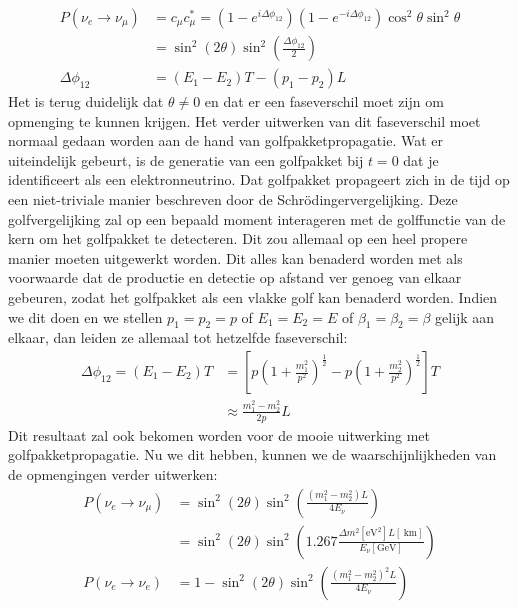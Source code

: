 \documentclass[../main.tex]{subfiles}
\begin{document}
\begin{equation}
    \begin{aligned}
        \label{eq:neutrino_2_oscilaties_5}
        P\left(\nu_{e} \rightarrow \nu_{\mu}\right) &=c_{\mu} c_{\mu}^{*}=\left(1-e^{i \Delta \phi_{12}}\right)\left(1-e^{-i \Delta \phi_{12}}\right) \cos ^{2} \theta \sin ^{2} \theta \\
                                                    &=\sin ^{2}(2 \theta) \sin ^{2}\left(\frac{\Delta \phi_{12}}{2}\right)\\
        \Delta \phi_{12}&=\left(E_{1}-E_{2}\right) T-\left(p_{1}-p_{2}\right) L
    \end{aligned}
\end{equation}
Het is terug duidelijk dat $\theta\neq 0$ en dat er een faseverschil moet zijn om opmenging te kunnen krijgen. Het verder uitwerken van dit faseverschil moet normaal gedaan worden aan de hand van golfpakketpropagatie. Wat er uiteindelijk gebeurt, is de generatie van een golfpakket bij $t=0$ dat je identificeert als een elektronneutrino. Dat golfpakket propageert zich in de tijd op een niet-triviale manier beschreven door de Schrödingervergelijking. Deze golfvergelijking zal op een bepaald moment interageren met de golffunctie van de kern om het golfpakket te detecteren. Dit zou allemaal op een heel propere manier moeten uitgewerkt worden. Dit alles kan benaderd worden met als voorwaarde dat de productie en detectie op afstand ver genoeg van elkaar gebeuren, zodat het golfpakket als een vlakke golf kan benaderd worden. Indien we dit doen en we stellen $p_{1}=p_{2}=p$ of $E_{1}=E_{2}=E$ of $\beta_{1}=\beta_{2}=\beta$ gelijk aan elkaar, dan leiden ze allemaal tot hetzelfde faseverschil:
\begin{equation}
    \begin{aligned}
        \label{eq:neutrino_2_oscilaties_6}
        \Delta \phi_{12}=\left(E_{1}-E_{2}\right) T &=\left[p\left(1+\frac{m_{1}^{2}}{p^{2}}\right)^{\frac{1}{2}}-p\left(1+\frac{m_{2}^{2}}{p^{2}}\right)^{\frac{1}{2}}\right] T \\
                                                    & \approx \frac{m_{1}^{2}-m_{2}^{2}}{2 p} L
    \end{aligned}
\end{equation}
Dit resultaat zal ook bekomen worden voor de mooie uitwerking met golfpakketpropagatie. Nu we dit hebben, kunnen we de waarschijnlijkheden van de opmengingen verder uitwerken:
\begin{equation}
    \begin{aligned}
        \label{eq:neutrino_2_oscilaties_7}
        P\left(\nu_{e} \rightarrow \nu_{\mu}\right) &=\sin ^{2}(2 \theta) \sin ^{2}\left(\frac{\left(m_{1}^{2}-m_{2}^{2}\right) L}{4 E_{\nu}}\right) \\
                                                    &=\sin ^{2}(2 \theta) \sin ^{2}\left(1.267 \frac{\Delta m^{2}\left[\mathrm{eV}^{2}\right] L[\mathrm{~km}]}{E_{\nu}[\mathrm{GeV}]}\right) \\
        P\left(\nu_{e} \rightarrow \nu_{e}\right) &=1-\sin ^{2}(2 \theta) \sin ^{2}\left(\frac{\left(m_{1}^{2}-m_{2}^{2}\right)^{2} L}{4 E_{\nu}}\right)
    \end{aligned}
\end{equation}
\end{document}
